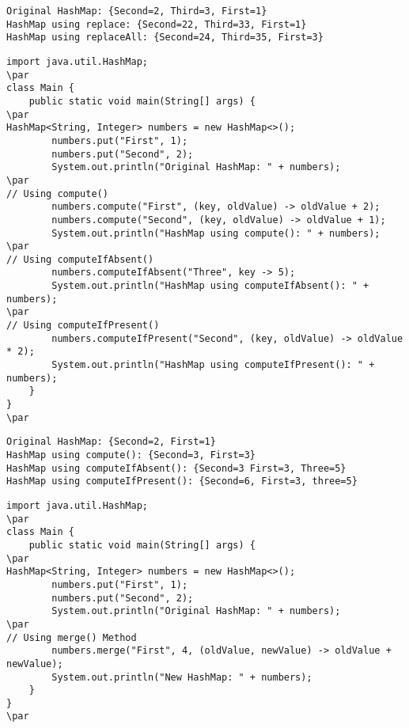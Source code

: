 \documentclass{book}
\def\lthtmlcheckvsize{\ifdim\ht\sizebox<\vsize 
  \ifdim\wd\sizebox<\hsize\expandafter\hfill\fi \expandafter\vfill
  \else\expandafter\vss\fi}%
\begin{document}
{\newpage\clearpage
{}%
\begin{lstlisting}
Original HashMap: {Second=2, Third=3, First=1}
HashMap using replace: {Second=22, Third=33, First=1}
HashMap using replaceAll: {Second=24, Third=35, First=3}
\end{lstlisting}%
\lthtmlfigureZ
\lthtmlcheckvsize\clearpage}

{\newpage\clearpage
{}%
\begin{lstlisting}
import java.util.HashMap;
\par
class Main {
    public static void main(String[] args) {
\par
HashMap<String, Integer> numbers = new HashMap<>();
        numbers.put("First", 1);
        numbers.put("Second", 2);
        System.out.println("Original HashMap: " + numbers);
\par
// Using compute()
        numbers.compute("First", (key, oldValue) -> oldValue + 2);
        numbers.compute("Second", (key, oldValue) -> oldValue + 1);
        System.out.println("HashMap using compute(): " + numbers);
\par
// Using computeIfAbsent()
        numbers.computeIfAbsent("Three", key -> 5);
        System.out.println("HashMap using computeIfAbsent(): " + numbers);
\par
// Using computeIfPresent()
        numbers.computeIfPresent("Second", (key, oldValue) -> oldValue * 2);
        System.out.println("HashMap using computeIfPresent(): " + numbers);
    }
}
\par
\end{lstlisting}%
\lthtmlfigureZ
\lthtmlcheckvsize\clearpage}

{\newpage\clearpage
{}%
\begin{lstlisting}
Original HashMap: {Second=2, First=1}
HashMap using compute(): {Second=3, First=3}
HashMap using computeIfAbsent(): {Second=3 First=3, Three=5}
HashMap using computeIfPresent(): {Second=6, First=3, three=5}
\end{lstlisting}%
\lthtmlfigureZ
\lthtmlcheckvsize\clearpage}

{\newpage\clearpage
{}%
\begin{lstlisting}
import java.util.HashMap;
\par
class Main {
    public static void main(String[] args) {
\par
HashMap<String, Integer> numbers = new HashMap<>();
        numbers.put("First", 1);
        numbers.put("Second", 2);
        System.out.println("Original HashMap: " + numbers);
\par
// Using merge() Method
        numbers.merge("First", 4, (oldValue, newValue) -> oldValue + newValue);
        System.out.println("New HashMap: " + numbers);
    }
}
\par
\end{lstlisting}%
\lthtmlfigureZ
\lthtmlcheckvsize\clearpage}
\end{document}
